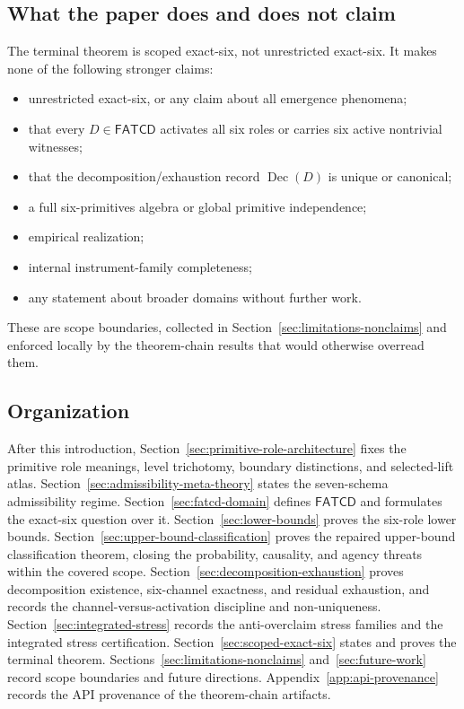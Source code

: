 \documentclass[11pt]{article}
\theoremstyle{definition}
\newcommand{\FATCD}{\ensuremath{\mathsf{FATCD}}}
\newcommand{\Dec}[1]{\ensuremath{\operatorname{Dec}\!\left(#1\right)}}
\begin{document}
\subsection{What the paper does and does not claim}\label{subsec:intro-nonclaims}

The terminal theorem is scoped exact-six, not unrestricted exact-six.
It makes none of the following stronger claims:
\begin{itemize}[topsep=2pt,itemsep=1pt]
  \item unrestricted exact-six, or any claim about all emergence
    phenomena;
  \item that every \(D \in \FATCD{}\) activates all six roles or
    carries six active nontrivial witnesses;
  \item that the decomposition/exhaustion record \(\Dec{D}\) is unique
    or canonical;
  \item a full six-primitives algebra or global primitive
    independence;
  \item empirical realization;
  \item internal instrument-family completeness;
  \item any statement about broader domains without further work.
\end{itemize}
These are scope boundaries, collected in
Section~\ref{sec:limitations-nonclaims} and enforced locally by the
theorem-chain results that would otherwise overread them.

\subsection{Organization}\label{subsec:organization}

After this introduction, Section~\ref{sec:primitive-role-architecture}
fixes the primitive role meanings, level trichotomy, boundary
distinctions, and selected-lift atlas. Section~\ref{sec:admissibility-meta-theory}
states the seven-schema admissibility regime. Section~\ref{sec:fatcd-domain}
defines \FATCD{} and formulates the exact-six question over it.
Section~\ref{sec:lower-bounds} proves the six-role lower bounds.
Section~\ref{sec:upper-bound-classification} proves the repaired
upper-bound classification theorem, closing the probability,
causality, and agency threats within the covered scope.
Section~\ref{sec:decomposition-exhaustion} proves decomposition
existence, six-channel exactness, and residual exhaustion, and records
the channel-versus-activation discipline and non-uniqueness.
Section~\ref{sec:integrated-stress} records the anti-overclaim stress
families and the integrated stress certification.
Section~\ref{sec:scoped-exact-six} states and proves the terminal
theorem. Sections~\ref{sec:limitations-nonclaims}
and~\ref{sec:future-work} record scope boundaries and future
directions. Appendix~\ref{app:api-provenance} records the API
provenance of the theorem-chain artifacts.
\end{document}
